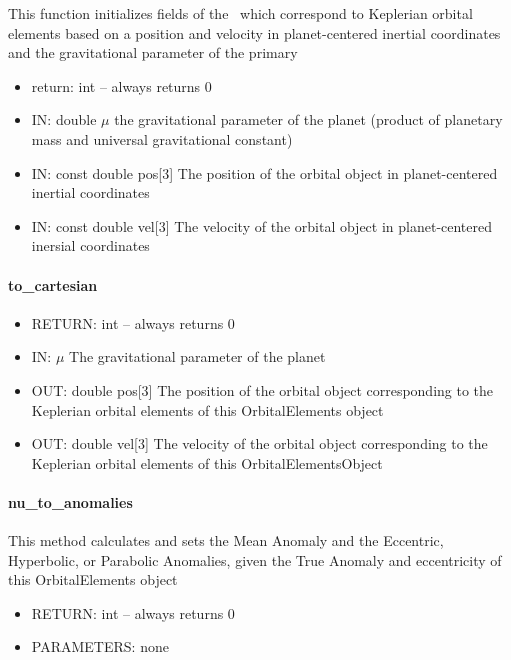 This function initializes fields of the \OrbitalElement\ which correspond
to Keplerian orbital elements based
on a position and velocity in planet-centered inertial coordinates
and the gravitational parameter of the primary

\begin{itemize}
\item{return:} int -- always returns $0$
\item{IN:}    double $\mu$ the gravitational parameter of the planet (product
of planetary mass and universal gravitational constant)
\item{IN:}    const double pos[$3$] The position of the orbital object
in planet-centered inertial coordinates
\item{IN:}   const double  vel[$3$] The velocity of the orbital object
in planet-centered inersial coordinates
\end{itemize}

\paragraph{to\_cartesian}

\begin{itemize}
\item{RETURN:}   int -- always returns $0$
\item{IN:}   $\mu$ The gravitational parameter of the planet
\item{OUT:}   double pos[$3$] The position of the orbital object corresponding
to the Keplerian orbital elements of this OrbitalElements object
\item{OUT:}   double vel[$3$]  The velocity of the orbital object corresponding to the Keplerian orbital
elements of this OrbitalElementsObject
\end{itemize}

\paragraph{nu\_to\_anomalies}

    This method calculates and sets the Mean Anomaly and the Eccentric, Hyperbolic, or
     Parabolic Anomalies, given the True Anomaly and eccentricity of
this OrbitalElements object

\begin{itemize}
\item{RETURN:}   int -- always returns $0$
\item{PARAMETERS:}   none
\end{itemize}

